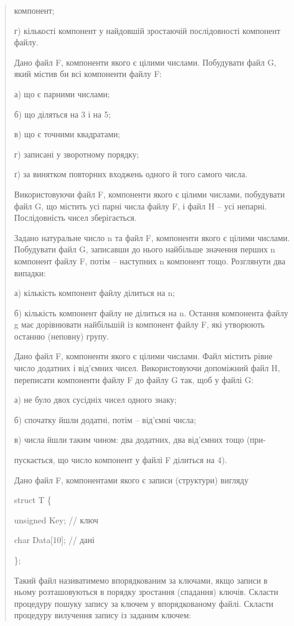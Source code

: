 \documentclass[]{article}
\begin{document}
\begin{quote}
компонент;

г) кількості компонент у найдовшій зростаючій послідовності компонент
файлу.

Дано файл F, компоненти якого є цілими числами. Побудувати файл G, який
містив би всі компоненти файлу F:

а) що є парними числами;

б) що діляться на 3 і на 5;

в) що є точними квадратами;

г) записані у зворотному порядку;

ґ) за винятком повторних входжень одного й того самого числа.

Використовуючи файл F, компоненти якого є цілими числами, побудувати
файл G, що містить усі парні числа файлу F, і файл H -- усі непарні.
Послідовність чисел зберігається.

Задано натуральне число n та файл F, компоненти якого є цілими числами.
Побудувати файл G, записавши до нього найбільше значення перших n
компонент файлу F, потім -- наступних n компонент тощо. Розглянути два
випадки:

а) кількість компонент файлу ділиться на n;

б) кількість компонент файлу не ділиться на n. Остання компонента файлу
g має дорівнювати найбільшій із компонент файлу F, які утворюють останню
(неповну) групу.

Дано файл F, компоненти якого є цілими числами. Файл містить рівне число
додатних і від'ємних чисел. Використовуючи допоміжний файл H, переписати
компоненти файлу F до файлу G так, щоб у файлі G:

а) не було двох сусідніх чисел одного знаку;

б) спочатку йшли додатні, потім -- від'ємні числа;

в) числа йшли таким чином: два додатних, два від'ємних тощо (при-

пускається, що число компонент у файлі F ділиться на 4).

Дано файл F, компонентами якого є записи (структури) вигляду

struct T \{

unsigned Key; // ключ

char Data{[}10{]}; // дані

\};

Такий файл називатимемо впорядкованим за ключами, якщо записи в ньому
розташовуються в порядку зростання (спадання) ключів. Скласти процедуру
пошуку запису за ключем у впорядкованому файлі. Скласти процедуру
вилучення запису із заданим ключем:


\end{quote}
\end{document}
